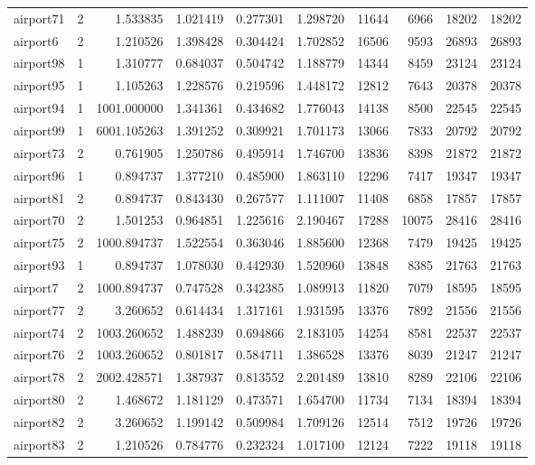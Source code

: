 \begin{longtable}{|l|r|r|r|r|r|r|r|r|r|}
airport71 & 2 & 1.533835 & 1.021419 & 0.277301 & 1.298720 & 11644 & 6966 & 18202 & 18202 \\
airport6 & 2 & 1.210526 & 1.398428 & 0.304424 & 1.702852 & 16506 & 9593 & 26893 & 26893 \\
airport98 & 1 & 1.310777 & 0.684037 & 0.504742 & 1.188779 & 14344 & 8459 & 23124 & 23124 \\
airport95 & 1 & 1.105263 & 1.228576 & 0.219596 & 1.448172 & 12812 & 7643 & 20378 & 20378 \\
airport94 & 1 & 1001.000000 & 1.341361 & 0.434682 & 1.776043 & 14138 & 8500 & 22545 & 22545 \\
airport99 & 1 & 6001.105263 & 1.391252 & 0.309921 & 1.701173 & 13066 & 7833 & 20792 & 20792 \\
airport73 & 2 & 0.761905 & 1.250786 & 0.495914 & 1.746700 & 13836 & 8398 & 21872 & 21872 \\
airport96 & 1 & 0.894737 & 1.377210 & 0.485900 & 1.863110 & 12296 & 7417 & 19347 & 19347 \\
airport81 & 2 & 0.894737 & 0.843430 & 0.267577 & 1.111007 & 11408 & 6858 & 17857 & 17857 \\
airport70 & 2 & 1.501253 & 0.964851 & 1.225616 & 2.190467 & 17288 & 10075 & 28416 & 28416 \\
airport75 & 2 & 1000.894737 & 1.522554 & 0.363046 & 1.885600 & 12368 & 7479 & 19425 & 19425 \\
airport93 & 1 & 0.894737 & 1.078030 & 0.442930 & 1.520960 & 13848 & 8385 & 21763 & 21763 \\
airport7 & 2 & 1000.894737 & 0.747528 & 0.342385 & 1.089913 & 11820 & 7079 & 18595 & 18595 \\
airport77 & 2 & 3.260652 & 0.614434 & 1.317161 & 1.931595 & 13376 & 7892 & 21556 & 21556 \\
airport74 & 2 & 1003.260652 & 1.488239 & 0.694866 & 2.183105 & 14254 & 8581 & 22537 & 22537 \\
airport76 & 2 & 1003.260652 & 0.801817 & 0.584711 & 1.386528 & 13376 & 8039 & 21247 & 21247 \\
airport78 & 2 & 2002.428571 & 1.387937 & 0.813552 & 2.201489 & 13810 & 8289 & 22106 & 22106 \\
airport80 & 2 & 1.468672 & 1.181129 & 0.473571 & 1.654700 & 11734 & 7134 & 18394 & 18394 \\
airport82 & 2 & 3.260652 & 1.199142 & 0.509984 & 1.709126 & 12514 & 7512 & 19726 & 19726 \\
airport83 & 2 & 1.210526 & 0.784776 & 0.232324 & 1.017100 & 12124 & 7222 & 19118 & 19118 \\

\end{longtable}
